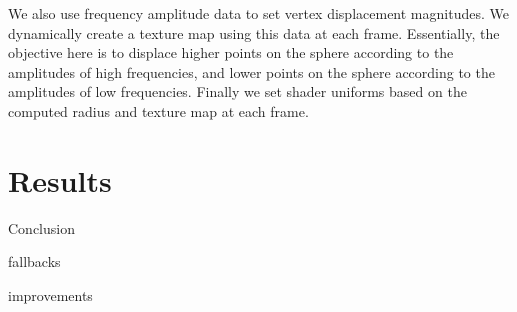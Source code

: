 \documentclass{article}
\begin{document}
We also use frequency amplitude data to set vertex displacement magnitudes. We dynamically create a texture map using this data at each frame. Essentially, the objective here is to displace higher points on the sphere according to the amplitudes of high frequencies, and lower points on the sphere according to the amplitudes of low frequencies. Finally we set shader uniforms based on the computed radius and texture map at each frame.

\section{Results}

Conclusion

fallbacks

improvements
\end{document}
